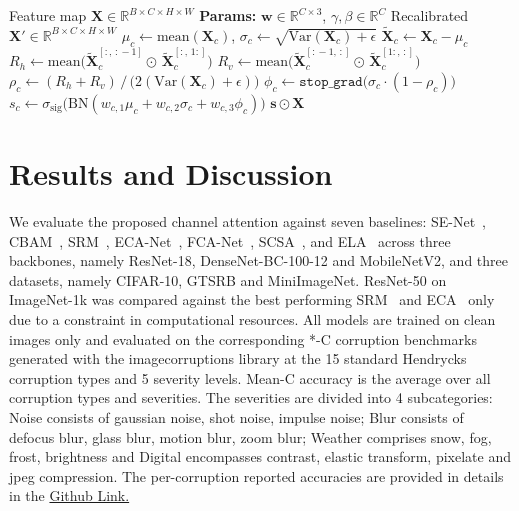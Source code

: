 \documentclass{bmvc2k}
\begin{document}
\begin{algorithm}[h]
\caption{Algorithm for the proposed LACE}
\label{alg:proposedalgorithm}
\begin{algorithmic}[1]
\Require Feature map $\mathbf{X} \in \mathbb{R}^{B \times C \times H \times W}$
\Statex \textbf{Params:} $\mathbf{w} \in \mathbb{R}^{C \times 3}$,\; $\gamma, \beta \in \mathbb{R}^{C}$ 
\Ensure Recalibrated $\mathbf{X}' \in \mathbb{R}^{B \times C \times H \times W}$
    \State $\mu_c \gets \mathrm{mean}(\mathbf{X}_c)$,\;\; $\sigma_c \gets \sqrt{\mathrm{Var}(\mathbf{X}_c) + \epsilon}$
    \State $\tilde{\mathbf{X}}_c \gets \mathbf{X}_c - \mu_c$ 
    \State $R_h \gets \mathrm{mean}\!\big(\tilde{\mathbf{X}}_c^{[:,\,:\!-\!1]} \!\odot\, \tilde{\mathbf{X}}_c^{[:,\,1:]}\big)$ 
    \State $R_v \gets \mathrm{mean}\!\big(\tilde{\mathbf{X}}_c^{[:\!-\!1,\,:]} \!\odot\, \tilde{\mathbf{X}}_c^{[1:,\,:]}\big)$ 
    \State $\rho_c \gets (R_h + R_v)\, /\, \big(2(\mathrm{Var}(\mathbf{X}_c) + \epsilon)\big)$ 
    \State $\phi_c \gets \texttt{stop\_grad}\!\big(\sigma_c \cdot (1 - \rho_c)\big)$ 
    \State $s_c \gets \sigma_{\text{sig}}\!\big(\mathrm{BN}(w_{c,1}\mu_c + w_{c,2}\sigma_c + w_{c,3}\phi_c)\big)$ 
\EndFor
\State \Return $\mathbf{s} \odot \mathbf{X}$ 
\end{algorithmic}
\end{algorithm}




\section{Results and Discussion} \label{results}

We evaluate the proposed channel attention against seven baselines: SE-Net~\cite{hu2018squeeze},
CBAM~\cite{woo2018cbam}, SRM~\cite{lee2020srm}, ECA-Net~\cite{wang2020eca}, FCA-Net~\cite{qin2021fcanet},
SCSA~\cite{si2022scsa}, and ELA~\cite{xu2021ela} across three backbones, namely ResNet-18, DenseNet-BC-100-12 and MobileNetV2, and three datasets, namely CIFAR-10, GTSRB and MiniImageNet. ResNet-50 on ImageNet-1k was compared against the best performing SRM~\cite{lee2020srm} and ECA~\cite{wang2020eca} only due to a constraint in computational resources. All models are trained on clean images only and evaluated on the corresponding *-C corruption benchmarks generated with the imagecorruptions library at the 15 standard Hendrycks corruption types and 5 severity levels. Mean-C accuracy is the average over all corruption types and severities. The severities are divided into 4 subcategories: Noise consists of gaussian noise, shot noise, impulse noise; Blur consists of defocus blur, glass blur, motion blur, zoom blur; Weather comprises snow, fog, frost, brightness and Digital encompasses contrast, elastic transform, pixelate and jpeg compression. The per-corruption reported accuracies are provided in details in the \href{https://github.com/KushajM/LACE-Lag-1-Autocorrelation-based-Channel-Excitation}{Github Link.}
\end{document}
